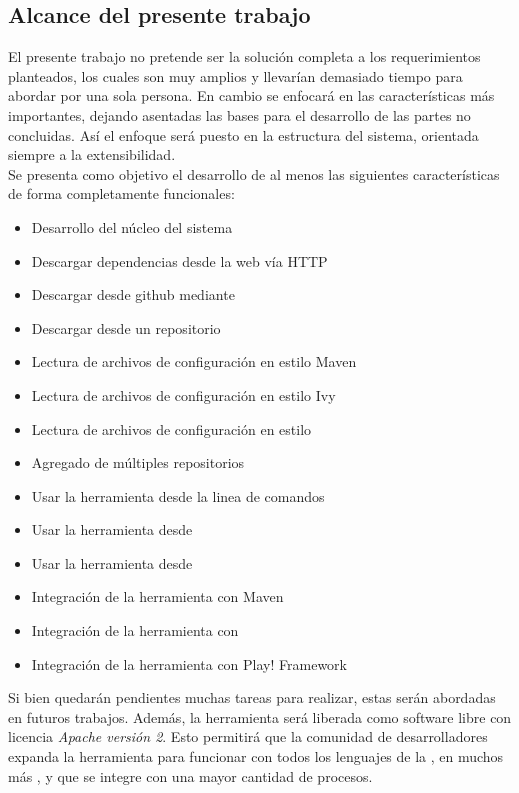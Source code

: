 \subsection{Alcance del presente trabajo}

El presente trabajo no pretende ser la solución completa a los requerimientos
planteados, los cuales son muy amplios y llevarían demasiado tiempo para abordar
por una sola persona. En cambio se enfocará en las características más importantes,
dejando asentadas las bases para el desarrollo de las partes no concluidas.
Así el enfoque será puesto en la estructura del sistema, orientada siempre a
la extensibilidad.\\
Se presenta como objetivo el desarrollo de al menos las 
siguientes características de forma completamente funcionales:
\begin{itemize}
	\item Desarrollo del núcleo del sistema
	\item Descargar dependencias desde la web vía HTTP
	\item Descargar desde \gls{github} mediante \git
	\item Descargar desde un repositorio \svn
	\item Lectura de archivos de configuración en \xml estilo Maven
	\item Lectura de archivos de configuración en \xml estilo Ivy
	\item Lectura de archivos de configuración en estilo \sbt
	\item Agregado de múltiples repositorios
	\item Usar la herramienta desde la linea de comandos
	\item Usar la herramienta desde \scala
	\item Usar la herramienta desde \java
	\item Integración de la herramienta con Maven
	\item Integración de la herramienta con \sbt
	\item Integración de la herramienta con Play! Framework
\end{itemize}
Si bien quedarán pendientes muchas tareas para realizar, estas serán abordadas
en futuros trabajos. Además, la herramienta será liberada como software libre con
licencia \emph{Apache versión 2}. Esto permitirá que la comunidad de desarrolladores
expanda la herramienta para funcionar con todos los lenguajes de la \jvm, en muchos
más \frameworks, y que se integre con una mayor cantidad de procesos.